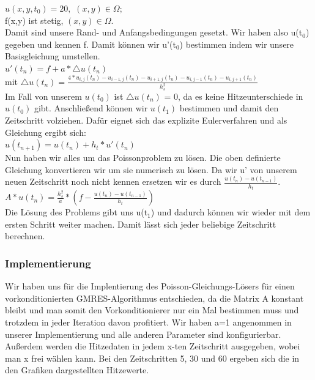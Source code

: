 \documentclass{report}
\begin{document}
$u(x,y,t_{0}) = 20,$   $ (x,y) \in \Omega ; $ \\
f(x,y) ist stetig,   $ (x,y) \in \Omega .$ \\
Damit sind unsere Rand- und Anfangsbedingungen gesetzt. Wir haben also u(t$_{0}$) gegeben und kennen f. Damit können wir u'(t$_{0}$) bestimmen indem wir unsere Basisgleichung umstellen.\\
$u'(t_{n})  = f + a * \triangle u(t_{n})$\\
mit $\triangle u(t_{n}) = \frac{4*u_{i,j}(t_{n})-u_{i-1,j}(t_{n})-u_{i+1,j}(t_{n})-u_{i,j-1}(t_{n})-u_{i,j+1}(t_{n})}{h_{s}^{2}}$\\
Im Fall von unserem $u(t_{0})$ ist $\triangle u(t_{n})$ = 0, da es keine Hitzeunterschiede in $u(t_{0})$ gibt. Anschließend können wir $u(t_{1})$ bestimmen und damit den Zeitschritt volziehen. Dafür eignet sich das explizite Eulerverfahren und als Gleichung ergibt sich:\\
$u(t_{n+1})  =u(t_{n}) + h_{t} * u'(t_{n})$\\
Nun haben wir alles um das Poissonproblem zu lösen. Die oben definierte Gleichung konvertieren wir um sie numerisch zu lösen. Da wir u' von unserem neuen Zeitschritt noch nicht kennen ersetzen wir es durch $\frac{ u(t_{n}) -  u(t_{n-1})}{h_{t}}$.\\
$A* u(t_{n}) = \frac{h_{s}^{2}}{a} * ( f-\frac{ u(t_{n}) -  u(t_{n-1})}{h_{t}}) $\\
Die Lösung des Problems gibt uns u(t$_{1}$) und dadurch können wir wieder mit dem ersten Schritt weiter machen. Damit lässt sich jeder beliebige Zeitschritt berechnen.
\subsubsection{Implementierung}
Wir haben uns für die Implentierung des Poisson-Gleichungs-Lösers für einen vorkonditionierten GMRES-Algorithmus entschieden, da die Matrix A konstant bleibt und man somit den Vorkonditionierer nur ein Mal bestimmen muss und trotzdem in jeder Iteration davon profitiert. Wir haben a=1 angenommen in unserer Implementierung und alle anderen Parameter sind konfigurierbar. Außerdem werden die Hitzedaten in jedem x-ten Zeitschritt ausgegeben, wobei man x frei wählen kann. Bei den Zeitschritten 5, 30 und 60 ergeben sich die in den Grafiken dargestellten Hitzewerte. \\
\end{document}
